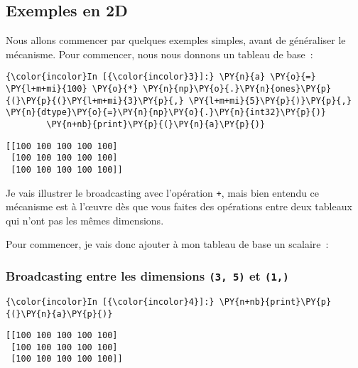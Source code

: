     \hypertarget{exemples-en-2d}{%
\subsection{Exemples en 2D}\label{exemples-en-2d}}

    Nous allons commencer par quelques exemples simples, avant de
généraliser le mécanisme. Pour commencer, nous nous donnons un tableau
de base~:

    \begin{Verbatim}[commandchars=\\\{\}]
{\color{incolor}In [{\color{incolor}3}]:} \PY{n}{a} \PY{o}{=} \PY{l+m+mi}{100} \PY{o}{*} \PY{n}{np}\PY{o}{.}\PY{n}{ones}\PY{p}{(}\PY{p}{(}\PY{l+m+mi}{3}\PY{p}{,} \PY{l+m+mi}{5}\PY{p}{)}\PY{p}{,} \PY{n}{dtype}\PY{o}{=}\PY{n}{np}\PY{o}{.}\PY{n}{int32}\PY{p}{)}
        \PY{n+nb}{print}\PY{p}{(}\PY{n}{a}\PY{p}{)}
\end{Verbatim}


    \begin{Verbatim}[commandchars=\\\{\}]
[[100 100 100 100 100]
 [100 100 100 100 100]
 [100 100 100 100 100]]

    \end{Verbatim}

    Je vais illustrer le broadcasting avec l'opération \texttt{+}, mais bien
entendu ce mécanisme est à l'œuvre dès que vous faites des opérations
entre deux tableaux qui n'ont pas les mêmes dimensions.

Pour commencer, je vais donc ajouter à mon tableau de base un scalaire~:

    \hypertarget{broadcasting-entre-les-dimensions-3-5-et-1}{%
\subsubsection{\texorpdfstring{Broadcasting entre les dimensions
\texttt{(3,\ 5)} et
\texttt{(1,)}}{Broadcasting entre les dimensions (3, 5) et (1,)}}\label{broadcasting-entre-les-dimensions-3-5-et-1}}

    \begin{Verbatim}[commandchars=\\\{\}]
{\color{incolor}In [{\color{incolor}4}]:} \PY{n+nb}{print}\PY{p}{(}\PY{n}{a}\PY{p}{)}
\end{Verbatim}


    \begin{Verbatim}[commandchars=\\\{\}]
[[100 100 100 100 100]
 [100 100 100 100 100]
 [100 100 100 100 100]]

    \end{Verbatim}

